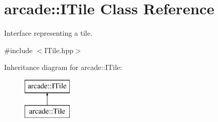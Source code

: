 \hypertarget{classarcade_1_1_i_tile}{\section{arcade\-:\-:I\-Tile Class Reference}
\label{classarcade_1_1_i_tile}
}


Interface representing a tile.  




{\ttfamily \#include $<$I\-Tile.\-hpp$>$}

Inheritance diagram for arcade\-:\-:I\-Tile\-:\begin{figure}[H]
\begin{center}
\leavevmode
\includegraphics[height=2.000000cm]{classarcade_1_1_i_tile}
\end{center}
\end{figure}
